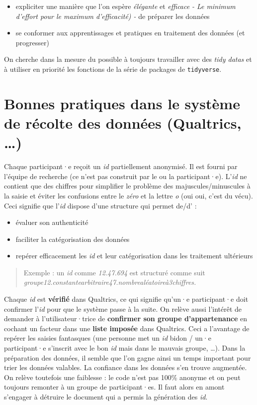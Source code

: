 \documentclass[
  letterpaper,
  DIV=11,
  numbers=noendperiod]{scrreprt}
\providecommand{\tightlist}{%
  \setlength{\itemsep}{0pt}\setlength{\parskip}{0pt}}\usepackage{longtable,booktabs,array}
\begin{document}
\begin{itemize}
\tightlist
\item
  expliciter une manière que l'on espère \emph{élégante} et
  \emph{efficace} \emph{- Le minimum d'effort pour le maximum
  d'efficacité) -} de préparer les données
\item
  se conformer aux apprentissages et pratiques en traitement des données
  (et progresser)
\end{itemize}

On cherche dans la mesure du possible à toujours travailler avec des
\emph{tidy datas} et à utiliser en priorité les fonctions de la série de
packages de \texttt{tidyverse}.

\hypertarget{bonnes-pratiques-dans-le-systuxe8me-de-ruxe9colte-des-donnuxe9es-qualtrics}{%
\section{Bonnes pratiques dans le système de récolte des données
(Qualtrics,
\ldots)}\label{bonnes-pratiques-dans-le-systuxe8me-de-ruxe9colte-des-donnuxe9es-qualtrics}}

Chaque participant·e reçoit un \emph{id} partiellement anonymisé. Il est
fourni par l'équipe de recherche (ce n'est pas construit par le ou la
participant·e). L'\emph{id} ne contient que des chiffres pour simplifier
le problème des majuscules/minuscules à la saisie et éviter les
confusions entre le \emph{zéro} et la lettre \emph{o} (oui oui, c'est du
vécu). Ceci signifie que l'\emph{id} dispose d'une structure qui permet
de/d' :

\begin{itemize}
\tightlist
\item
  évaluer son authenticité
\item
  faciliter la catégorisation des données
\item
  repérer efficacement les \emph{id} et leur catégorisation dans les
  traitement ultérieurs
\end{itemize}

\begin{quote}
Exemple : un \emph{id} comme \emph{12.47.694} est structuré comme suit
\emph{groupe12.constantearbitraire47.nombrealéatoireà3chiffres.}
\end{quote}

Chaque \emph{id} est \textbf{vérifié} dans Qualtrics, ce qui signifie
qu'un·e participant·e doit confirmer l'\emph{id} pour que le système
passe à la suite. On relève aussi l'intérêt de demander à
l'utilisateur·trice de \textbf{confirmer son groupe d'appartenance} en
cochant un facteur dans une \textbf{liste imposée} dans Qualtrics. Ceci
a l'avantage de repérer les saisies fantasques (une personne met un
\emph{id} bidon / un·e participant·e s'inscrit avec le bon \emph{id}
mais dans le mauvais groupe, \ldots). Dans la préparation des données,
il semble que l'on gagne ainsi un temps important pour trier les données
valables. La confiance dans les données s'en trouve augmentée. On relève
toutefois une faiblesse : le code n'est pas 100\% anonyme et on peut
toujours remonter à un groupe de participant·es. Il faut alors en amont
s'engager à détruire le document qui a permis la génération des
\emph{id}.
\end{document}
